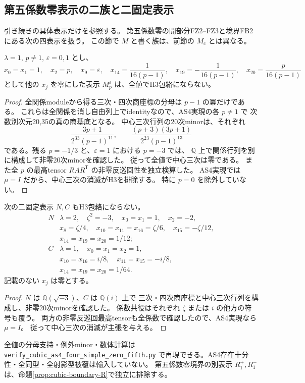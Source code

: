 \subsection{第五係数零表示の二族と二固定表示}
\label{subsec:cubic-as4-zero-fifth}
引き続き\cite{AS4lowpinned}の具体表示だけを参照する。
第五係数零の開部分FZ2--FZ3と境界FB2にある次の四表示を扱う。
この節で $M$ と書く族は、前節の $M_c$ とは異なる。

\begin{proposition}\label{prop:cubic-zero-fifth-m}
$\lambda=1$, $p\ne1$, $\varepsilon=0,1$ とし、
\[
 x_0=x_1=1,\quad x_2=p,\quad x_9=\varepsilon,\quad
 x_{14}=\frac1{16(p-1)},\quad x_{19}=-\frac1{16(p-1)},\quad
 x_{20}=\frac{p}{16(p-1)}
\]
として他の $x_j$ を零にした表示 $M^\varepsilon_p$ は、全値でH3包絡にならない。
\end{proposition}
\begin{proof}
全関係moduleから得る三次・四次商座標の分母は $p-1$ の冪だけである。
これらは全関係を消し自由列上でidentityなので、AS4実現の各 $p\ne1$ で
次数別次元20,35の真の商基底となる。
中心三次行列の20次minorは、それぞれ
\[
 \frac{3p+1}{2^{33}(p-1)^{11}},\qquad
 \frac{(p+3)(3p+1)}{2^{23}(p-1)^{13}}
\]
である。残る $p=-1/3$ と、$\varepsilon=1$ における $p=-3$ では、
$\mathbb Q$ 上で関係行列を別に構成して非零20次minorを確認した。
従って全値で中心三次は零である。
また全 $p$ の最高tensor $R A R^{\mathsf T}$ の非零反巡回性を独立検算した。
AS4実現では $\mu=I$ だから、中心三次の消滅がH3を排除する。
特に $p=0$ を除外していない。
\end{proof}

\begin{proposition}\label{prop:cubic-zero-fifth-fixed}
次の二固定表示 $N,C$ もH3包絡にならない。
\[
\begin{array}{c|l}
 N&\lambda=2,\quad \zeta^2=-3,\quad x_0=x_1=1,\quad x_2=-2,\\
 &x_8=\zeta/4,\quad x_{10}=x_{11}=x_{16}=\zeta/6,\quad x_{15}=-\zeta/12,\\
 &x_{14}=x_{19}=x_{20}=1/12;\\\hline
 C&\lambda=1,\quad x_0=x_1=x_2=1,\\
 &x_{10}=x_{16}=i/8,\quad x_{11}=x_{15}=-i/8,\\
 &x_{14}=x_{19}=x_{20}=1/64.
\end{array}
\]
記載のない $x_j$ は零とする。
\end{proposition}
\begin{proof}
$N$ は $\mathbb Q(\sqrt{-3})$、$C$ は $\mathbb Q(i)$ 上で
三次・四次商座標と中心三次行列を構成し、非零20次minorを確認した。
係数共役はそれぞれ $\zeta$ または $i$ の他方の符号も覆う。
両方の非零反巡回最高tensorも全係数で確認したので、AS4実現なら $\mu=I$。
従って中心三次の消滅が主張を与える。
\end{proof}

全値の分母支持・例外minor・数体計算は
\texttt{verify\_\allowbreak{}cubic\_\allowbreak{}as4\_\allowbreak{}four\_\allowbreak{}simple\_\allowbreak{}zero\_\allowbreak{}fifth.py}
で再現できる。AS4存在十分性・全同型・全射影型被覆は輸入していない。
第五係数零境界の別表示 $R^+_1,R^-_1$ は、命題\ref{prop:cubic-boundary-R}で独立に排除する。
